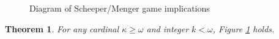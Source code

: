 \documentclass{amsart}
\newtheorem{theorem}{Theorem}[section]
\theoremstyle{definition}
\begin{document}
\begin{figure}[ht]
\begin{center}
\end{center}
\caption{Diagram of Scheeper/Menger game implications}
\label{GamesDiagram}
\end{figure}

\begin{theorem}
For any cardinal \(\kappa\geq\omega\) and integer \(k<\omega\),
Figure \ref{GamesDiagram} holds.
\end{theorem}
\end{document}
